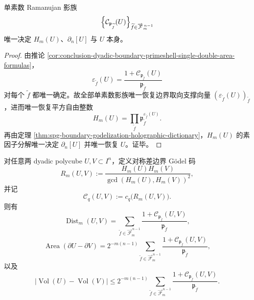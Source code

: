 \begin{theorem}\label{thm:conclusion-dyadic-boundary-single-primeshell-complete-holographic-coordinates}
单素数 Ramanujan 影族
\[
\Bigl\{\mathcal C_{\mathfrak p_{\widetilde f}}(U)\Bigr\}_{\widetilde f\in \overrightarrow{\mathcal F}^{\,n-1}_m}
\]
唯一决定 \(H_m(U)\)、\(\partial_n[U]\) 与 \(U\) 本身。
\end{theorem}

\begin{proof}
由推论 \ref{cor:conclusion-dyadic-boundary-primeshell-single-double-area-formulas}，
\[
\varepsilon_{\widetilde f}(U)
=
\frac{1+\mathcal C_{\mathfrak p_{\widetilde f}}(U)}{\mathfrak p_{\widetilde f}}
\]
对每个 \(\widetilde f\) 都唯一确定。故全部单素数影族唯一恢复边界取向支撑向量 \((\varepsilon_{\widetilde f}(U))_{\widetilde f}\)，进而唯一恢复平方自由整数
\[
H_m(U)
=
\prod_{\widetilde f}\mathfrak p_{\widetilde f}^{\varepsilon_{\widetilde f}(U)}.
\]
再由定理 \ref{thm:spg-boundary-godelization-holographic-dictionary}，\(H_m(U)\) 的素因子分解唯一决定 \(\partial_n[U]\) 并唯一恢复 \(U\)。证毕。
\end{proof}

\begin{theorem}\label{thm:conclusion-dyadic-boundary-primeshell-ramanujan-stokes-symmetric-difference}
对任意两 dyadic polycube \(U,V\subset I^n\)，定义对称差边界 Gödel 码
\[
R_m(U,V)
:=
\frac{H_m(U)H_m(V)}{\gcd(H_m(U),H_m(V))^2},
\]
并记
\[
\mathcal C_q(U,V):=c_q\!\bigl(R_m(U,V)\bigr).
\]
则有
\[
\operatorname{Dist}_m(U,V)
=
\sum_{\widetilde f\in \overrightarrow{\mathcal F}^{\,n-1}_m}
\frac{1+\mathcal C_{\mathfrak p_{\widetilde f}}(U,V)}{\mathfrak p_{\widetilde f}},
\]
\[
\operatorname{Area}(\partial U-\partial V)
=
2^{-m(n-1)}
\sum_{\widetilde f\in \overrightarrow{\mathcal F}^{\,n-1}_m}
\frac{1+\mathcal C_{\mathfrak p_{\widetilde f}}(U,V)}{\mathfrak p_{\widetilde f}},
\]
以及
\[
\bigl|\operatorname{Vol}(U)-\operatorname{Vol}(V)\bigr|
\le
2^{-m(n-1)}
\sum_{\widetilde f\in \overrightarrow{\mathcal F}^{\,n-1}_m}
\frac{1+\mathcal C_{\mathfrak p_{\widetilde f}}(U,V)}{\mathfrak p_{\widetilde f}}.
\]
\end{theorem}

